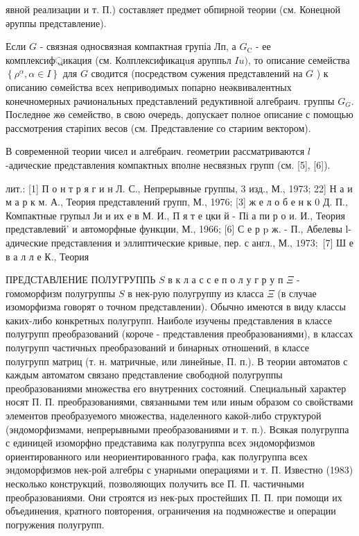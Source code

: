 \documentclass[10pt]{article}
\begin{document}
явной реализации и т. П.) составляет предмет обпирной теории (см. Конецной әруппы представление).



Если $G$ - связная односвязная компактная групіа Лп, а $G_{\mathrm{C}}$ - ее комплексиф্রикация (см. Колплексификацuя аруппьл $I u)$, то описание семейства $\left\{\rho^{\alpha}, \alpha \in I\right\}$ для $G$ сводится (посредством сужения представлений на $G$ ) к описанию сөмейства всех неприводимых попарно неәквивалентных конечномерных рачиональных представлений редуктивной алгебраич. группы $G_{G}$. Последнөе жө семейство, в свою очередь, допускает полное описание с помощью рассмотрения старіпих весов (см. Представление со стариим вектором).



В современной теории чисел и алгебраич. геометрии рассматриваются $l$-адические представления компактных вполне несвязных групп (см. [5], [6]).



лит.: [1] П о н т р я г и н Л. С., Непрерывные группы, 3 изд., М., 1973; 22] Н а и м а р к м. А., Теория представлений групп, М., 1976; [3] ж е л о б е н к 0 Д. П., Компактные групыл Ји и их е в М. И., П я т е цки й - Пі а пи р о и. И., Теория представлевий' и автоморфные функции, М., 1966; [6] С е р p ж. - П., Абелевы l-адические представления и эллиптические кривые, пер. с англ., М., $1973 ;$ [7] Ш е в а л л е К., Теория



ПРЕДСТАВЛЕНИЕ ПОЛУГРУППЬ $S$ в к л а с с е п о л у г р у п $\Xi$ - гомоморфизм полугруппы $S$ в нек-рую полугруппу из класса $\Xi$ (в случае изоморфизма говорят о точном представлении). Обычно имеются в виду классы каких-либо конкретных полугрупп. Наиболе изучены представления в классе полугрупп преобразований (короче - представления преобразованиями), в классах полугрупп частичных преобразований и бинарных отношений, в классе полугрупп матриц (т. н. матричные, или линейные, П. п.). В теории автоматов с каждым автоматом связано представление свободной полугруппы преобразованиями множества его внутренних состояний. Специальный характер носят П. П. преобразованиями, связанными тем или иным образом со свойствами элементов преобразуемого множества, наделенного какой-либо структурой (эндоморфизмами, непрерывными преобразованиями и т. п.). Всякая полугруппа с единицей изоморфно представима как полугруппа всех эндоморфизмов ориентированного или неориентированного графа, как полугруппа всех эндоморфизмов нек-рой алгебры с унарными операциями и т. П. Известно (1983) несколько конструкций, позволяющих получить все П. П. частичными преобразованиями. Они строятся из нек-рых простейших П. П. при помощи их объединения, кратного повторения, ограничения на подмножестве и операции погружения полугрупп.
\end{document}
